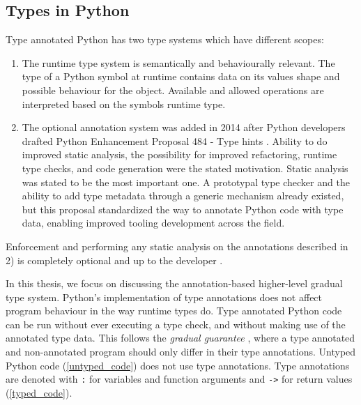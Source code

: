 \subsection{Types in Python}

Type annotated Python has two type systems which have different scopes:
\begin{enumerate}
    \item The runtime type system is semantically and behaviourally relevant. The type of a Python symbol at runtime contains data on its values shape and possible behaviour for the object. Available and allowed operations are interpreted based on the symbols runtime type.
    \item The optional annotation system was added in 2014 after Python developers drafted Python Enhancement Proposal 484 - Type hints \cite{pep_484}. Ability to do improved static analysis, the possibility for improved refactoring, runtime type checks, and code generation were the stated motivation. Static analysis was stated to be the most important one. A prototypal type checker and the ability to add type metadata through a generic mechanism already existed, but this proposal standardized the way to annotate Python code with type data, enabling improved tooling development across the field.
\end{enumerate}

Enforcement and performing any static analysis on the annotations described in 2) is completely optional and up to the developer \cite{python_typing}.

In this thesis, we focus on discussing the annotation-based higher-level gradual type system. Python's implementation of type annotations does not affect program behaviour in the way runtime types do. Type annotated Python code can be run without ever executing a type check, and without making use of the annotated type data. This follows the \emph{gradual guarantee} \cite{siek_refined_gradual_2015}, where a type annotated and non-annotated program should only differ in their type annotations. Untyped Python code (\ref{untyped_code}) does not use type annotations. Type annotations are denoted with {\tt :} for variables and function arguments and {\tt ->} for return values (\ref{typed_code}).

